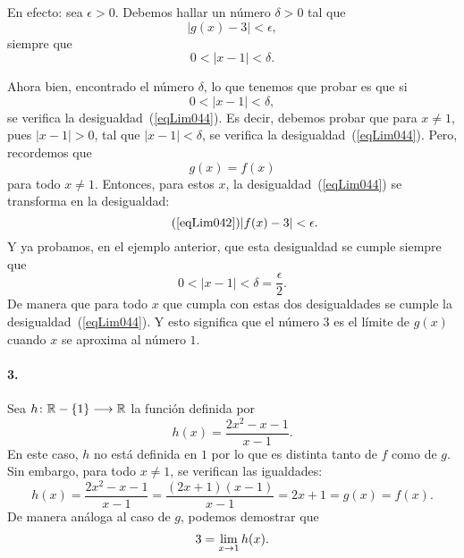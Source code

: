 En efecto: sea $\epsilon > 0$. Debemos hallar un número $\delta > 0$ tal que
\begin{equation}
\label{eqLim044}
|g(x) - 3| < \epsilon,
\end{equation}
siempre que
\[
0 < |x - 1| < \delta.
\]

Ahora bien, encontrado el número $\delta$, lo que tenemos que probar es que si
\[
0 < |x - 1| < \delta,
\]
se verifica la desigualdad~(\ref{eqLim044}). Es decir, debemos probar que para $x \neq 1$, pues $|x
- 1| > 0$, tal que $|x - 1| < \delta$, se verifica la desigualdad~(\ref{eqLim044}). Pero,
recordemos que
\[
g(x) = f(x)
\]
para todo $x\neq 1$. Entonces, para estos $x$, la desigualdad~(\ref{eqLim044}) se transforma en la
desigualdad:
\[
\tag{\ref{eqLim042}}
|f(x) - 3| < \epsilon.
\]
Y ya probamos, en el ejemplo anterior, que esta desigualdad se cumple siempre que
\[
0 < |x - 1| < \delta = \frac{\epsilon}{2}.
\]
De manera que para todo $x$ que cumpla con estas dos desigualdades se cumple la
desigualdad~(\ref{eqLim044}). Y esto significa que el número $3$ es el límite de $g(x)$ cuando $x$
se aproxima al número $1$.

\paragraph{3.} Sea $\funcjc{h}{\mathbb{R} - \{1\}}{\mathbb{R}}$ la función definida por
\[
h(x) = \frac{2x^2 - x - 1}{x - 1}.
\]
En este caso, $h$ no está definida en $1$ por lo que es distinta tanto de $f$ como de $g$. Sin
embargo, para todo $x\neq 1$, se verifican las igualdades:
\[
h(x) = \frac{2x^2 - x - 1}{x-1} = \frac{(2x+1)(x-1)}{x-1} = 2x + 1 = g(x) = f(x).
\]
De manera análoga al caso de $g$, podemos demostrar que
\[
3 = \limjc{h(x)}{x}{1}.
\]

